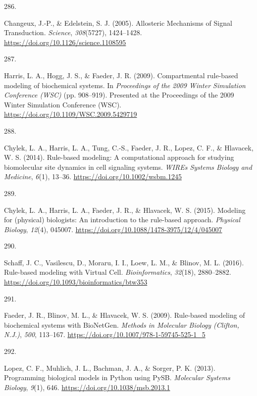 \documentclass[
  11pt,
  letterpaper,
]{scrreprt}
\newlength{\cslhangindent}
\newlength{\csllabelwidth}
\newenvironment{CSLReferences}[2] %
 {\begin{list}{}{%
  \setlength{\itemindent}{0pt}
  \setlength{\leftmargin}{0pt}
  \setlength{\parsep}{0pt}
  \ifodd #1
   \setlength{\leftmargin}{\cslhangindent}
   \setlength{\itemindent}{-1\cslhangindent}
  \fi
  \setlength{\itemsep}{#2\baselineskip}}}
 {\end{list}}
\newcommand{\CSLLeftMargin}[1]{\parbox[t]{\csllabelwidth}{\strut#1\strut}}
\newcommand{\CSLRightInline}[1]{\parbox[t]{\linewidth - \csllabelwidth}{\strut#1\strut}}
\begin{document}
\begin{CSLReferences}{0}{0}
\CSLLeftMargin{286. }%
\CSLRightInline{Changeux, J.-P., \& Edelstein, S. J. (2005). Allosteric
{Mechanisms} of {Signal Transduction}. \emph{Science}, \emph{308}(5727),
1424--1428. \url{https://doi.org/10.1126/science.1108595}}

\CSLLeftMargin{287. }%
\CSLRightInline{Harris, L. A., Hogg, J. S., \& Faeder, J. R. (2009).
Compartmental rule-based modeling of biochemical systems. In
\emph{Proceedings of the 2009 {Winter Simulation Conference} ({WSC})}
(pp. 908--919). Presented at the Proceedings of the 2009 {Winter
Simulation Conference} ({WSC}).
\url{https://doi.org/10.1109/WSC.2009.5429719}}

\CSLLeftMargin{288. }%
\CSLRightInline{Chylek, L. A., Harris, L. A., Tung, C.-S., Faeder, J.
R., Lopez, C. F., \& Hlavacek, W. S. (2014). Rule-based modeling: A
computational approach for studying biomolecular site dynamics in cell
signaling systems. \emph{WIREs Systems Biology and Medicine},
\emph{6}(1), 13--36. \url{https://doi.org/10.1002/wsbm.1245}}

\CSLLeftMargin{289. }%
\CSLRightInline{Chylek, L. A., Harris, L. A., Faeder, J. R., \&
Hlavacek, W. S. (2015). Modeling for (physical) biologists: An
introduction to the rule-based approach. \emph{Physical Biology},
\emph{12}(4), 045007.
\url{https://doi.org/10.1088/1478-3975/12/4/045007}}

\CSLLeftMargin{290. }%
\CSLRightInline{Schaff, J. C., Vasilescu, D., Moraru, I. I., Loew, L.
M., \& Blinov, M. L. (2016). Rule-based modeling with {Virtual Cell}.
\emph{Bioinformatics}, \emph{32}(18), 2880--2882.
\url{https://doi.org/10.1093/bioinformatics/btw353}}

\CSLLeftMargin{291. }%
\CSLRightInline{Faeder, J. R., Blinov, M. L., \& Hlavacek, W. S. (2009).
Rule-based modeling of biochemical systems with {BioNetGen}.
\emph{Methods in Molecular Biology (Clifton, N.J.)}, \emph{500},
113--167. \url{https://doi.org/10.1007/978-1-59745-525-1_5}}

\CSLLeftMargin{292. }%
\CSLRightInline{Lopez, C. F., Muhlich, J. L., Bachman, J. A., \& Sorger,
P. K. (2013). Programming biological models in {Python} using {PySB}.
\emph{Molecular Systems Biology}, \emph{9}(1), 646.
\url{https://doi.org/10.1038/msb.2013.1}}


\end{CSLReferences}
\end{document}
